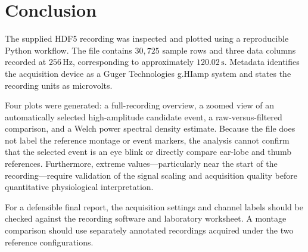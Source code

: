 \documentclass[12pt,a4paper]{article}
\begin{document}
\section{Conclusion}
The supplied HDF5 recording was inspected and plotted using a reproducible Python workflow. The file contains $30{,}725$ sample rows and three data columns recorded at $256\,\mathrm{Hz}$, corresponding to approximately $120.02\,\mathrm{s}$. Metadata identifies the acquisition device as a Guger Technologies g.HIamp system and states the recording units as microvolts.

Four plots were generated: a full-recording overview, a zoomed view of an automatically selected high-amplitude candidate event, a raw-versus-filtered comparison, and a Welch power spectral density estimate. Because the file does not label the reference montage or event markers, the analysis cannot confirm that the selected event is an eye blink or directly compare ear-lobe and thumb references. Furthermore, extreme values—particularly near the start of the recording—require validation of the signal scaling and acquisition quality before quantitative physiological interpretation.

For a defensible final report, the acquisition settings and channel labels should be checked against the recording software and laboratory worksheet. A montage comparison should use separately annotated recordings acquired under the two reference configurations.
\end{document}
